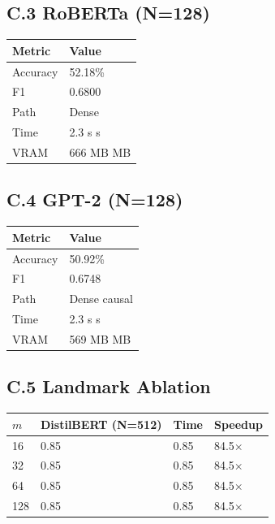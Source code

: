 \subsection{C.3 RoBERTa (N=128)}

\begin{table}[H]
\centering
\small
\begin{tabular}{ll}
\toprule
\textbf{Metric} & \textbf{Value} \\
\midrule
Accuracy & 52.18\% \\
F1 & 0.6800 \\
Path & Dense \\
Time & 2.3 s s \\
VRAM & 666 MB MB \\
\bottomrule
\end{tabular}
\end{table}

\subsection{C.4 GPT-2 (N=128)}

\begin{table}[H]
\centering
\small
\begin{tabular}{ll}
\toprule
\textbf{Metric} & \textbf{Value} \\
\midrule
Accuracy & 50.92\% \\
F1 & 0.6748 \\
Path & Dense causal \\
Time & 2.3 s s \\
VRAM & 569 MB MB \\
\bottomrule
\end{tabular}
\end{table}

\subsection{C.5 Landmark Ablation}

\begin{table}[H]
\centering
\small
\begin{tabular}{llll}
\toprule
\textbf{$m$} & \textbf{DistilBERT (N=512)} & \textbf{Time} & \textbf{Speedup} \\
\midrule
16 & 0.85 & 0.85 & 84.5$\times$ \\
32 & 0.85 & 0.85 & 84.5$\times$ \\
64 & 0.85 & 0.85 & 84.5$\times$ \\
128 & 0.85 & 0.85 & 84.5$\times$ \\
\bottomrule
\end{tabular}
\end{table}

